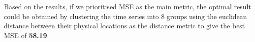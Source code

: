 \documentclass[nonblindrev,msom]{informs3} %
\begin{document}

\noindent Based on the results, if we prioritised MSE as the main metric, the optimal result could be obtained by clustering the time series into 8 groups using the euclidean distance between their physical locations as the distance metric to give the best MSE of \textbf{58.19}. 

%
%
%
\end{document}
